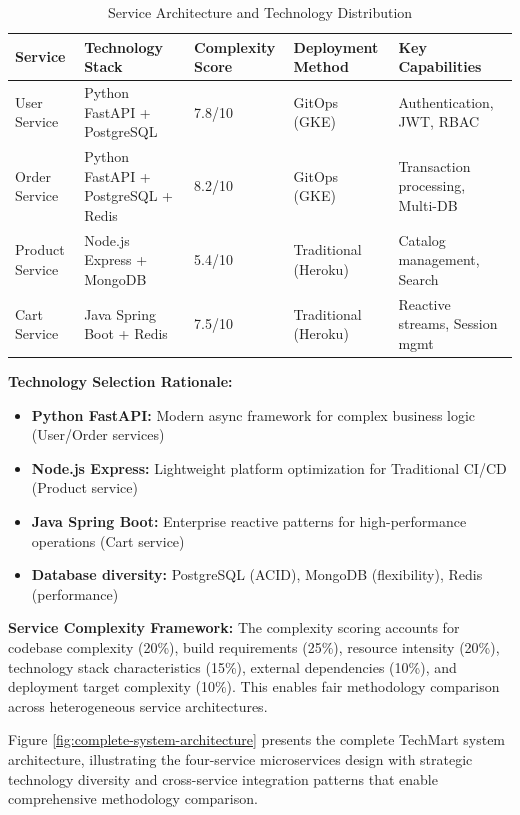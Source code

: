 \begin{table}[H]
\centering
\caption{Service Architecture and Technology Distribution}
\label{tab:service-architecture-comparison}
\renewcommand{\arraystretch}{1.2}
\footnotesize
\begin{tabular}{|p{2.2cm}|p{3.5cm}|p{1.8cm}|p{2.8cm}|p{3.2cm}|}
\hline
\textbf{Service} & \textbf{Technology Stack} & \textbf{Complexity Score} & \textbf{Deployment Method} & \textbf{Key Capabilities} \\
\hline
User Service & Python FastAPI + PostgreSQL & 7.8/10 & GitOps (GKE) & Authentication, JWT, RBAC \\
\hline
Order Service & Python FastAPI + PostgreSQL + Redis & 8.2/10 & GitOps (GKE) & Transaction processing, Multi-DB \\
\hline
Product Service & Node.js Express + MongoDB & 5.4/10 & Traditional (Heroku) & Catalog management, Search \\
\hline
Cart Service & Java Spring Boot + Redis & 7.5/10 & Traditional (Heroku) & Reactive streams, Session mgmt \\
\hline
\end{tabular}
\end{table}

\textbf{Technology Selection Rationale:}
\begin{itemize}
\item \textbf{Python FastAPI:} Modern async framework for complex business logic (User/Order services)
\item \textbf{Node.js Express:} Lightweight platform optimization for Traditional CI/CD (Product service)
\item \textbf{Java Spring Boot:} Enterprise reactive patterns for high-performance operations (Cart service)
\item \textbf{Database diversity:} PostgreSQL (ACID), MongoDB (flexibility), Redis (performance)
\end{itemize}

\textbf{Service Complexity Framework:}
The complexity scoring accounts for codebase complexity (20\%), build requirements (25\%), resource intensity (20\%), technology stack characteristics (15\%), external dependencies (10\%), and deployment target complexity (10\%). This enables fair methodology comparison across heterogeneous service architectures.

Figure \ref{fig:complete-system-architecture} presents the complete TechMart system architecture, illustrating the four-service microservices design with strategic technology diversity and cross-service integration patterns that enable comprehensive methodology comparison.

